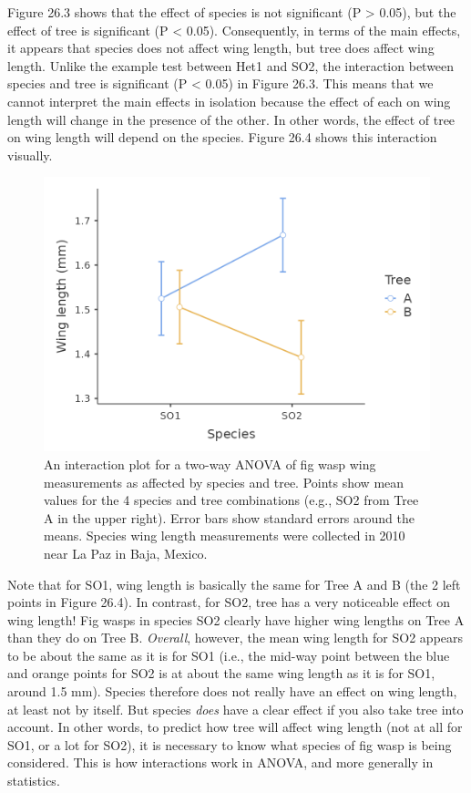 \documentclass[
]{scrbook}
\begin{document}
Figure 26.3 shows that the effect of species is not significant (P \textgreater{} 0.05), but the effect of tree is significant (P \textless{} 0.05).
Consequently, in terms of the main effects, it appears that species does not affect wing length, but tree does affect wing length.
Unlike the example test between Het1 and SO2, the interaction between species and tree is significant (P \textless{} 0.05) in Figure 26.3.
This means that we cannot interpret the main effects in isolation because the effect of each on wing length will change in the presence of the other.
In other words, the effect of tree on wing length will depend on the species.
Figure 26.4 shows this interaction visually.

\begin{figure}
\includegraphics[width=1\linewidth]{img/two-way_ANOVA_with_interaction} \caption{An interaction plot for a two-way ANOVA of fig wasp wing measurements as affected by species and tree. Points show mean values for the 4 species and tree combinations (e.g., SO2 from Tree A in the upper right). Error bars show standard errors around the means. Species wing length measurements were collected in 2010 near La Paz in Baja, Mexico.}\label{fig:unnamed-chunk-124}
\end{figure}

Note that for SO1, wing length is basically the same for Tree A and B (the 2 left points in Figure 26.4).
In contrast, for SO2, tree has a very noticeable effect on wing length!
Fig wasps in species SO2 clearly have higher wing lengths on Tree A than they do on Tree B.
\emph{Overall}, however, the mean wing length for SO2 appears to be about the same as it is for SO1 (i.e., the mid-way point between the blue and orange points for SO2 is at about the same wing length as it is for SO1, around 1.5 mm).
Species therefore does not really have an effect on wing length, at least not by itself.
But species \emph{does} have a clear effect if you also take tree into account.
In other words, to predict how tree will affect wing length (not at all for SO1, or a lot for SO2), it is necessary to know what species of fig wasp is being considered.
This is how interactions work in ANOVA, and more generally in statistics.
\end{document}
